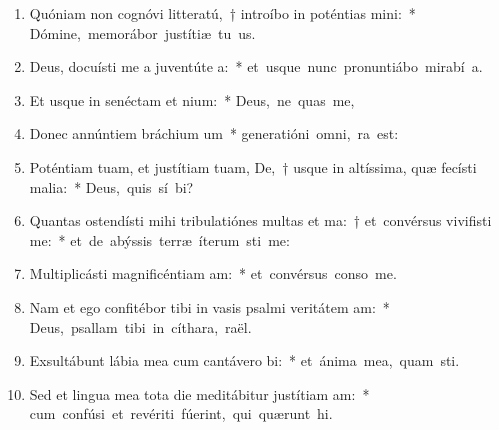 \begin{flushleft}
\begin{enumerate}[leftmargin=*]
\item Quóniam non cognóvi litteratú,~† introíbo in poténtias mini:~* \mbox{Dómine, memorábor justítiæ tu us.}
\item Deus, docuísti me a juventúte a:~* \mbox{et usque nunc pronuntiábo mirabí a.}
\item Et usque in senéctam et nium:~* \mbox{Deus, ne quas me,}
\item Donec annúntiem bráchium um~* \mbox{generatióni omni,  ra est:}
\item Poténtiam tuam, et justítiam tuam, De,~† usque in altíssima, quæ fecísti malia:~* \mbox{Deus, quis sí bi?}
\item Quantas ostendísti mihi tribulatiónes multas et ma:~† et~convérsus vivifisti me:~* \mbox{et de abýssis terræ íterum sti me:}
\item Multiplicásti magnificéntiam am:~* \mbox{et convérsus conso  me.}
\item Nam et ego confitébor tibi in vasis psalmi veritátem am:~* \mbox{Deus, psallam tibi in cíthara,  raël.}
\item Exsultábunt lábia mea cum cantávero bi:~* \mbox{et ánima mea, quam sti.}
\item Sed et lingua mea tota die meditábitur justítiam am:~* \mbox{cum confúsi et revériti fúerint, qui quærunt  hi.}

\end{enumerate}
\end{flushleft}

